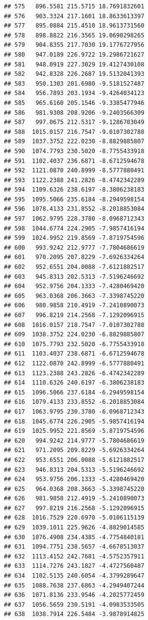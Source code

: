 \documentclass[
]{article}
\begin{document}
\begin{verbatim}
## 575   896.5581 215.5715 18.7691832601
## 576   903.3324 217.1601 18.8633613397
## 577   895.0884 215.4510 18.9613731560
## 578   898.8822 216.3565 19.0690298265
## 579   904.8355 217.7030 19.1776727956
## 580   947.0189 226.9722 19.2986721627
## 581   948.0919 227.3029 19.4127430108
## 582   942.8328 226.2687 19.5132041393
## 583   950.1303 201.6980 -9.5181527487
## 584   956.7893 203.1934 -9.4264034123
## 585   965.6160 205.1546 -9.3385477946
## 586   981.9308 208.9206 -9.2403566309
## 587   997.0675 212.5317 -9.1286703049
## 588  1015.0157 216.7547 -9.0107302788
## 589  1037.3752 222.0230 -8.8829885807
## 590  1074.7793 230.5020 -8.7755433918
## 591  1102.4037 236.6871 -8.6712594678
## 592  1121.0870 240.8999 -8.5777880491
## 593  1122.2388 241.2826 -8.4742342289
## 594  1109.6326 238.6197 -8.3806238183
## 595  1095.5066 235.6184 -8.2949598154
## 596  1078.4133 231.8552 -8.2018853084
## 597  1062.9795 228.3780 -8.0968712343
## 598  1044.6774 224.2905 -7.9857416194
## 599  1024.9952 219.8569 -7.8719754596
## 600   993.9242 212.9777 -7.7804686619
## 601   970.2095 207.8229 -7.6926334264
## 602   952.6551 204.0088 -7.6121882517
## 603   945.8313 202.5313 -7.5196246692
## 604   952.9756 204.1333 -7.4280469420
## 605   963.0368 206.3663 -7.3398745220
## 606   980.9858 210.4919 -7.2410890073
## 607   996.8219 214.2568 -7.1292096915
## 608  1016.0157 218.7547 -7.0107302788
## 609  1038.3752 224.0230 -6.8829885807
## 610  1075.7793 232.5020 -6.7755433918
## 611  1103.4037 238.6871 -6.6712594678
## 612  1122.0870 242.8999 -6.5777880491
## 613  1123.2388 243.2826 -6.4742342289
## 614  1110.6326 240.6197 -6.3806238183
## 615  1096.5066 237.6184 -6.2949598154
## 616  1079.4133 233.8552 -6.2018853084
## 617  1063.9795 230.3780 -6.0968712343
## 618  1045.6774 226.2905 -5.9857416194
## 619  1025.9952 221.8569 -5.8719754596
## 620   994.9242 214.9777 -5.7804686619
## 621   971.2095 209.8229 -5.6926334264
## 622   953.6551 206.0088 -5.6121882517
## 623   946.8313 204.5313 -5.5196246692
## 624   953.9756 206.1333 -5.4280469420
## 625   964.0368 208.3663 -5.3398745220
## 626   981.9858 212.4919 -5.2410890073
## 627   997.8219 216.2568 -5.1292096915
## 628  1016.7529 220.6970 -5.0106115139
## 629  1039.1011 225.9626 -4.8829014585
## 630  1076.4908 234.4385 -4.7754840181
## 631  1094.7751 238.5657 -4.6678513037
## 632  1113.4152 242.7681 -4.5752357911
## 633  1114.7276 243.1827 -4.4727560487
## 634  1102.5135 240.6054 -4.3799289647
## 635  1088.7638 237.6863 -4.2949407244
## 636  1071.8136 233.9546 -4.2025772459
## 637  1056.5659 230.5191 -4.0983533505
## 638  1038.7914 226.5484 -3.9878914825

\end{verbatim}
\end{document}

